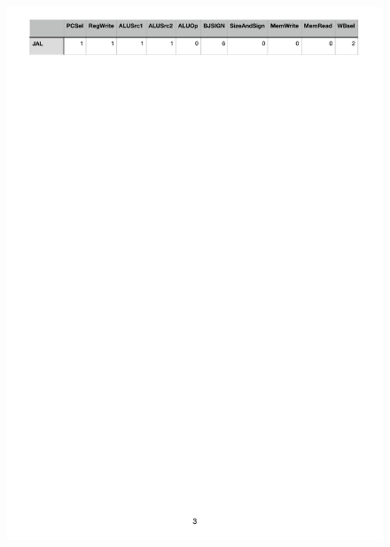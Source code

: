     \begin{figure}[h!]
        \vspace{-3cm}
        
        \hspace*{-2cm}
        \includegraphics[scale=1]{pictures/Controltable3.pdf}
    \end{figure} 
